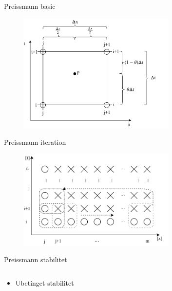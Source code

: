 \begin{frame}{Preissmann basic}{}
\vfill\vfill\centering
		\begin{figure}[H]
			\centering
			\includegraphics[width=0.7\textwidth]{Sections/pictures/preissmann_scheme.pdf}
		\end{figure}
\vfill\vfill		
\end{frame}

\begin{frame}{Preissmann iteration}{}
\vfill\vfill\centering
		\begin{figure}[H]
			\centering
			\includegraphics[width=0.7\textwidth]{Sections/pictures/preissmann_scheme_iteration.pdf}
		\end{figure}
\vfill\vfill		
\end{frame}


\begin{frame}{Preissmann stabilitet}{}
\vfill\vfill\centering
	\begin{columns}
		\begin{column}{0.25\textwidth}
		\vspace{20mm}
			\begin{itemize}
				\item Ubetinget stabilitet
			\end{itemize}
		\end{column}

		\begin{column}{0.7\textwidth}
			\begin{figure}[H]
	  			
			\end{figure}
		\end{column}
	\end{columns}			
\vfill\vfill		
\end{frame}



